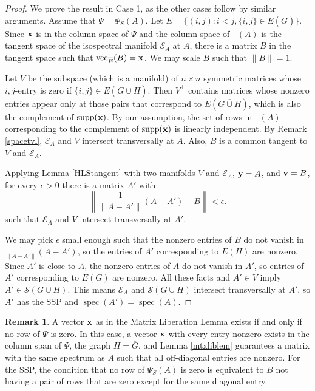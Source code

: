 \documentclass[11pt]{article}
\theoremstyle{definition}
\newtheorem{rem}[thm]{Remark}
\theoremstyle{definition}
\theoremstyle{definition}
\DeclareMathOperator{\supp}{supp}
\DeclareMathOperator{\TSS}{TS_S}
\newcommand{\Ec}{\overline{E}}
\newcommand{\verS}{\Psi_S}
\newcommand{\Gc}{\overline{G}}
\newcommand{\bx}{{\bf x}}
\newcommand{\bv}{{\bf v}}
\newcommand{\by}{{\bf y}}
\newcommand{\mptn}{\mathcal{S}} %
\newcommand{\mei}{\mathcal{E}} %
\newcommand{\vect}{\operatorname{vec}}
\def\spec{\operatorname{spec}}
\begin{document}
\begin{proof}
We prove the result in Case 1, as the other cases follow by similar arguments.
Assume that $\Psi = \verS(A)$.  Let $\Ec=\{(i,j):i<j,\{i,j\}\in E(\Gc)\}$.  Since $\bx$ is in the column space of $\Psi$ and the column space of $\TSS(A)$ is the tangent space of the isospectral manifold $\mei_A$ at $A$, there is a matrix $B$ in the tangent space such that $\vect_{\Ec}(B)=\bx$.  We may scale $B$ such that $\|B\|=1$.

Let $V$ be the subspace (which is a  manifold) of $n\times n$ symmetric matrices whose $i,j$-entry is zero if $\{i,j\}\in E(\overline{G\cup H})$.  Then $V^\perp$ contains matrices whose nonzero entries appear only  at those pairs that correspond to $E(\overline{G\cup H})$, which is also the complement of $\supp(\bx)$.  By our assumption, the set of rows in $\TSS(A)$ corresponding to the complement of $\supp(\bx)$ is linearly independent.  By Remark \ref{spacetvl}, $\mei_A$ and $V$ intersect transversally at $A$.  Also, $B$ is a common tangent to $V$ and $\mei_A$.

Applying Lemma \ref{HLStangent} with two manifolds $V$ and $\mei_A$, $\by=A$, and $\bv=B$, for every $\epsilon>0$ there is a matrix $A'$ with 
\[\left\|\frac{1}{\|A-A'\|}(A-A')-B\right\|<\epsilon.\]
such that $\mei_A$ and $V$ intersect transversally at $A'$.

We may pick $\epsilon$ small enough such that the nonzero entries of $B$ do not vanish in $\frac{1}{\|A-A'\|}(A-A')$, so the entries of $A'$ corresponding to $E(H)$ are nonzero.  Since $A'$ is close to $A$, the nonzero entries of $A$ do not vanish in $A'$, so entries of $A'$ corresponding to $E(G)$ are nonzero.  All these facts and  $A'\in V$ imply $A'\in\mptn(G\cup H)$.  This means $\mei_A$ and $\mptn(G\cup H)$ intersect transversally at $A'$, so $A'$ has the SSP and $\spec(A')=\spec(A)$.
\end{proof}


\begin{rem}  A vector $\bx$ as in the Matrix Liberation Lemma exists if and only if no row of $\Psi$ is zero. In this case,  a vector $\bx$ with every entry nonzero exists in the column span of $\Psi$, the graph $H=\Gc$, and Lemma \ref{mtxliblem} guarantees a matrix with the same spectrum as $A$ such that all off-diagonal entries are nonzero. For the SSP, the condition that   no row of $ \verS(A)$ is zero  is equivalent to $B$ not having a pair of rows that are zero  except for the same diagonal entry.
\end{rem}
\end{document}
